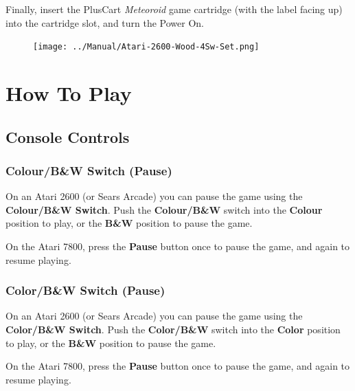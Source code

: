 \documentclass[10pt,twocolumn,openany,article]{memoir}
\begin{document}
Finally,     insert    the     \ifdefined\PLUSCART    PlusCart     \else
\textit{Meteoroid} game  cartridge (with the  label facing up)  \fi into
the cartridge slot, and turn the Power On.

\begin{figure}[h]
  \begin{center}
    \texttt{[image: ../Manual/Atari-2600-Wood-4Sw-Set.png]}
  \end{center}
\end{figure}


\vfill

\chapter{How To Play}

\section{Console Controls}

\ifdefined\TVSECAM
\else

\ifdefined\TVPAL
\subsection{Colour/B\&W Switch (Pause)}

On an  Atari 2600  (or Sears Arcade)  you can pause  the game  using the
\textbf{Colour/B\&W Switch}.  Push the \textbf{Colour/B\&W}  switch into
the \textbf{Colour} position  to play, or the  \textbf{B\&W} position to
pause the game.

\ifdefined\PLUSCART\else
On the  Atari 7800, press  the \textbf{Pause}  button once to  pause the
game, and again to resume playing.
\fi

\else

\subsection{Color/B\&W Switch (Pause)}

On an  Atari 2600  (or Sears Arcade)  you can pause  the game  using the
\textbf{Color/B\&W Switch}. Push the \textbf{Color/B\&W} switch into the
\textbf{Color} position to play, or the \textbf{B\&W} position to pause the game.

\ifdefined\PLUSCART\else
On the  Atari 7800, press  the \textbf{Pause}  button once to  pause the
game, and again to resume playing.
\fi

\fi
\fi
\end{document}
